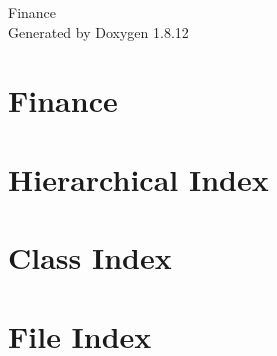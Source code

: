 \documentclass[twoside]{book}
\newcommand{\+}{\discretionary{\mbox{\scriptsize$\hookleftarrow$}}{}{}}
\newcommand{\clearemptydoublepage}{%
  \newpage{\pagestyle{empty}\cleardoublepage}%
}
\begin{document}
\hypersetup{pageanchor=false,
             bookmarksnumbered=true,
             pdfencoding=unicode
            }
\begin{titlepage}
\vspace*{7cm}
\begin{center}%
{\Large Finance }\\
\vspace*{1cm}
{\large Generated by Doxygen 1.8.12}\\
\end{center}
\end{titlepage}
\clearemptydoublepage
{}
\tableofcontents
\clearemptydoublepage
{}
\hypersetup{pageanchor=true}

\chapter{Finance}
\label{md__users__c_u_i__dropbox__c_09_09__finance__r_e_a_d_m_e}
\hypertarget{md__users__c_u_i__dropbox__c_09_09__finance__r_e_a_d_m_e}{}

\chapter{Hierarchical Index}

\chapter{Class Index}

\chapter{File Index}

\end{document}
